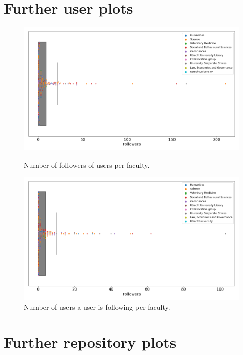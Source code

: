 \chapter{Further user plots}
\label{app:user_plots}
\vspace{-1.1cm}
\begin{figure}[htb!]
\centerline{
\includegraphics[scale=0.48]{figures_results/extra/user_followers.png}}
\caption{Number of followers of users per faculty.}
\vspace{-0.45cm}
\centerline{
\includegraphics[scale=0.48]{figures_results/extra/user_following.png}}
\caption{Number of users a user is following per faculty.}

\end{figure}


\chapter{Further repository plots}
\label{app:repo_plots}

